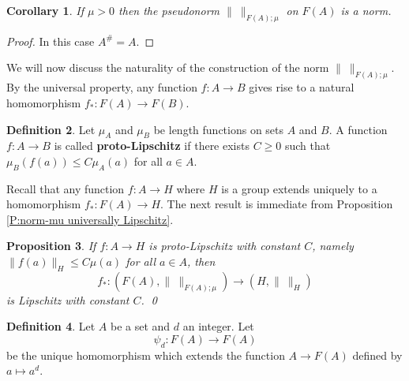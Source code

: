 \documentclass[12pt]{amsart}
\newtheorem{prop}{Proposition}[section]
\newtheorem{cor}[prop]{Corollary}
\theoremstyle{definition}
\newtheorem{defn}[prop]{Definition}
\newcommand{\OP}[1]{\operatorname{#1}}
\def\Free{F}
\begin{document}
\begin{cor}
If $\mu>0$ then the pseudonorm $\| \ \|_{F(A);\mu}$ on $F(A)$ is a norm.
\end{cor}

\begin{proof}
In this case $A^\#=A$.
\end{proof}





We will now discuss the naturality of the construction of the norm $\| \ \|_{\Free(A);\mu}$. 
By the universal property, any function $f \colon A \to B$ gives rise to a natural homomorphism $f_* \colon \Free(A) \to \Free(B)$.


\begin{defn}\label{D:proto-Lipschitz}
Let $\mu_A$ and $\mu_B$ be length functions on sets $A$ and $B$.
A function $f \colon A \to B$ is called {\bf proto-Lipschitz} if there exists $C \geq 0$ such that $\mu_B (f(a)) \leq C \mu_A(a)$ for all $a \in A$.
\end{defn}




Recall that any function $f \colon A \to H$ where $H$ is a group extends uniquely to a homomorphism $f_* \colon \Free(A) \to H$.
The next result is immediate from Proposition \ref{P:norm-mu universally Lipschitz}.

\begin{prop}\label{P:naturality Lipschitz F(A)->F(B)}
If $f \colon A \to H$ is proto-Lipschitz with constant $C$, namely $\|f(a)\|_H \leq C\mu(a)$ for all $a \in A$, then 
\[
f_* \colon (\Free(A), \| \ \|_{\Free(A);\mu}) \to (H, \| \ \|_H)
\]
is Lipschitz with constant $C$.
\qed
\end{prop}



\begin{defn}\label{D:psi-d in F(A)}
Let $A$ be a set and $d$ an integer.
Let
\[
\psi_d \colon \Free(A) \to \Free(A)
\]
be the unique homomorphism which extends the function $A \to \Free(A)$ defined by $a\mapsto a^d$.
\end{defn}
\end{document}
